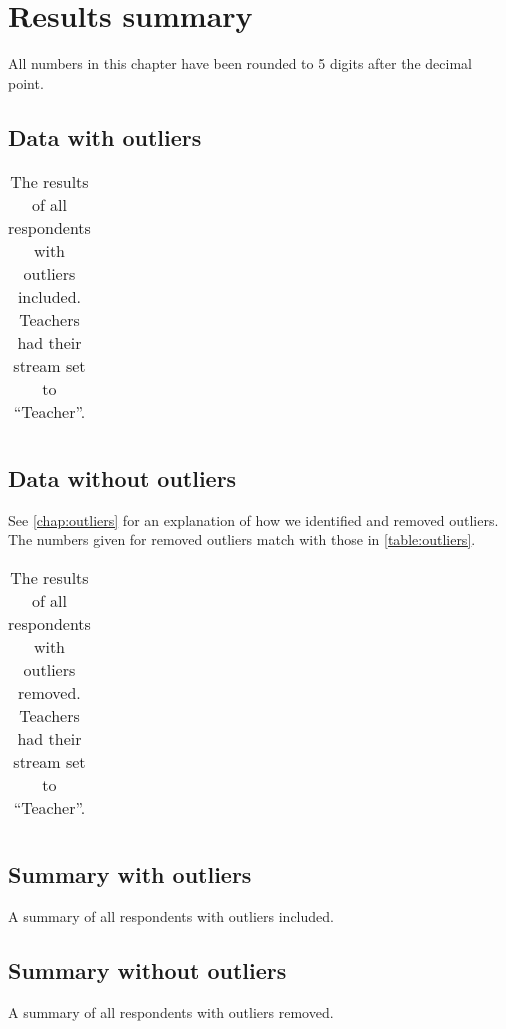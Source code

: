 \chapter{Results summary}
All numbers in this chapter have been rounded to 5 digits after the decimal point.

\section{Data with outliers}
\begin{longtable}{rrrlll}
	\caption{The results of all respondents with outliers included. Teachers had their stream set to ``Teacher''.}
	\label{table:outliers}
	
\end{longtable}

\section{Data without outliers}
See \vref{chap:outliers} for an explanation of how we identified and removed outliers.
The numbers given for removed outliers match with those in \vref{table:outliers}.
\begin{longtable}{rrrlll}
	\caption{The results of all respondents with outliers removed. Teachers had their stream set to ``Teacher''.}
	\label{table:noOutliers}
	
\end{longtable}

\section{Summary with outliers}
\begin{table}[H]
	\caption{A summary of all respondents with outliers included.}
	\label{table:outliersSummary}
	\begin{center}
		
	\end{center}
\end{table}

\section{Summary without outliers}
\begin{table}[H]
	\caption{A summary of all respondents with outliers removed.}
	\label{table:noOutliersSummary}
	\begin{center}
		
	\end{center}
\end{table}
